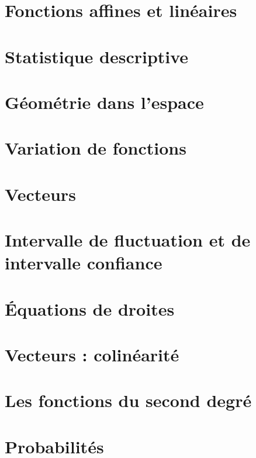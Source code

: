 \documentclass[a4paper,10pt]{book}
\begin{document}
\chapter{Fonctions affines et linéaires}


\chapter{Statistique descriptive}


\chapter{Géométrie dans l'espace}


\chapter{Variation de fonctions}

\chapter{Vecteurs}


\chapter{Intervalle de fluctuation et de intervalle confiance}


\chapter{Équations de droites}


\chapter{Vecteurs : colinéarité}


\chapter{Les fonctions du second degré}


\chapter{Probabilités}

\end{document}
